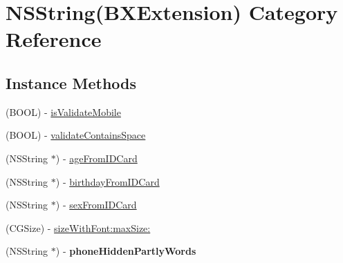 \hypertarget{category_n_s_string_07_b_x_extension_08}{}\section{N\+S\+String(B\+X\+Extension) Category Reference}
\label{category_n_s_string_07_b_x_extension_08}
\subsection*{Instance Methods}
\begin{DoxyCompactItemize}
\item 
(B\+O\+OL) -\/ \mbox{\hyperlink{category_n_s_string_07_b_x_extension_08_a1583e09115711bdc6a9ee0abff6611ca}{is\+Validate\+Mobile}}
\item 
(B\+O\+OL) -\/ \mbox{\hyperlink{category_n_s_string_07_b_x_extension_08_a5873d41b48f9dbf21299b31fdbf1ec0c}{validate\+Contains\+Space}}
\item 
(N\+S\+String $\ast$) -\/ \mbox{\hyperlink{category_n_s_string_07_b_x_extension_08_a35064bd6a5b401064197de8aea3e05e7}{age\+From\+I\+D\+Card}}
\item 
(N\+S\+String $\ast$) -\/ \mbox{\hyperlink{category_n_s_string_07_b_x_extension_08_ad8f6326c384270c7a3b48a718ce83f39}{birthday\+From\+I\+D\+Card}}
\item 
(N\+S\+String $\ast$) -\/ \mbox{\hyperlink{category_n_s_string_07_b_x_extension_08_a499dc3f8c5172cec77f3a6ef6bc11c7a}{sex\+From\+I\+D\+Card}}
\item 
(C\+G\+Size) -\/ \mbox{\hyperlink{category_n_s_string_07_b_x_extension_08_a8cc6fa8637ddcd726ba3b02a9f3a744d}{size\+With\+Font\+:max\+Size\+:}}
\item 
\mbox{\label{category_n_s_string_07_b_x_extension_08_a153baffa739177572fdd55391b796309}} 
(N\+S\+String $\ast$) -\/ {\bfseries phone\+Hidden\+Partly\+Words}
\end{DoxyCompactItemize}
